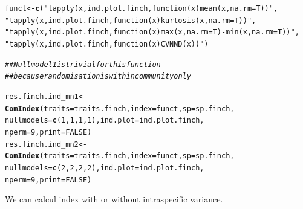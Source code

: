 \documentclass[12pt]{article}\usepackage[]{graphicx}\usepackage[]{color}
\makeatletter
\newcommand{\hlnum}[1]{\textcolor[rgb]{0.686,0.059,0.569}{#1}}%
\newcommand{\hlstr}[1]{\textcolor[rgb]{0.192,0.494,0.8}{#1}}%
\newcommand{\hlcom}[1]{\textcolor[rgb]{0.678,0.584,0.686}{\textit{#1}}}%
\newcommand{\hlstd}[1]{\textcolor[rgb]{0.345,0.345,0.345}{#1}}%
\newcommand{\hlkwb}[1]{\textcolor[rgb]{0.69,0.353,0.396}{#1}}%
\newcommand{\hlkwc}[1]{\textcolor[rgb]{0.333,0.667,0.333}{#1}}%
\newcommand{\hlkwd}[1]{\textcolor[rgb]{0.737,0.353,0.396}{\textbf{#1}}}%
\newenvironment{kframe}{%
 \def\at@end@of@kframe{}%
 \ifinner\ifhmode%
  \def\at@end@of@kframe{\end{minipage}}%
  \begin{minipage}{\columnwidth}%
 \fi\fi%
 \def\FrameCommand##1{\hskip\@totalleftmargin \hskip-\fboxsep
 \colorbox{shadecolor}{##1}\hskip-\fboxsep
     \hskip-\linewidth \hskip-\@totalleftmargin \hskip\columnwidth}%
 \MakeFramed {\advance\hsize-\width
   \@totalleftmargin\z@ \linewidth\hsize
   \@setminipage}}%
 {\par\unskip\endMakeFramed%
 \at@end@of@kframe}
\newenvironment{knitrout}{}{} %
\makeatother
\begin{document}
\begin{knitrout}
\color{fgcolor}\begin{kframe}
\begin{alltt}
\hlstd{funct}\hlkwb{<-}\hlkwd{c}\hlstd{(}\hlstr{"tapply(x, ind.plot.finch, function(x) mean(x, na.rm=T))"}\hlstd{,}
         \hlstr{"tapply(x, ind.plot.finch, function(x) kurtosis(x, na.rm=T))"}\hlstd{,}
         \hlstr{"tapply(x, ind.plot.finch, function(x) max(x, na.rm=T)-min(x, na.rm=T))"}\hlstd{,}
         \hlstr{"tapply(x, ind.plot.finch, function(x) CVNND(x))"}  \hlstd{)}

\hlcom{##Null model 1 is trivial for this function}
\hlcom{##because randomisation is within community only}

\hlstd{res.finch.ind_mn1}\hlkwb{<-}\hlkwd{ComIndex}\hlstd{(}\hlkwc{traits}\hlstd{=traits.finch,} \hlkwc{index}\hlstd{=funct,} \hlkwc{sp}\hlstd{=sp.finch,}
                             \hlkwc{nullmodels}\hlstd{=}\hlkwd{c}\hlstd{(}\hlnum{1}\hlstd{,}\hlnum{1}\hlstd{,}\hlnum{1}\hlstd{,}\hlnum{1}\hlstd{),} \hlkwc{ind.plot}\hlstd{=ind.plot.finch,}
                             \hlkwc{nperm}\hlstd{=}\hlnum{9}\hlstd{,} \hlkwc{print}\hlstd{=}\hlnum{FALSE}\hlstd{)}
\hlstd{res.finch.ind_mn2}\hlkwb{<-}\hlkwd{ComIndex}\hlstd{(}\hlkwc{traits}\hlstd{=traits.finch,} \hlkwc{index}\hlstd{=funct,} \hlkwc{sp}\hlstd{=sp.finch,}
                             \hlkwc{nullmodels}\hlstd{=}\hlkwd{c}\hlstd{(}\hlnum{2}\hlstd{,}\hlnum{2}\hlstd{,}\hlnum{2}\hlstd{,}\hlnum{2}\hlstd{),} \hlkwc{ind.plot}\hlstd{=ind.plot.finch,}
                             \hlkwc{nperm}\hlstd{=}\hlnum{9}\hlstd{,} \hlkwc{print}\hlstd{=}\hlnum{FALSE}\hlstd{)}
\end{alltt}
\end{kframe}
\end{knitrout}


We can calcul index with or without intraspecific variance.
\end{document}
